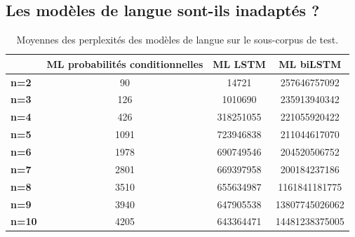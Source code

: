 \documentclass[10pt,twoside]{article}
\begin{document}
    \subsection{Les modèles de langue sont-ils inadaptés ?}

    \begin{table}[h]
    \begin{footnotesize}
    \begin{center}
    \begin{tabular}{|l|c|c|c|}
    \hline
                  & \textbf{ML probabilités conditionnelles} & \multicolumn{1}{r|}{\textbf{ML LSTM}} & \textbf{ML biLSTM} \\ \hline
    \textbf{n=2}  & 90                                       & 14721                                 & 257646757092       \\ \hline
    \textbf{n=3}  & 126                                      & 1010690                               & 235913940342       \\ \hline
    \textbf{n=4}  & 426                                      & 318251055                             & 221055920422       \\ \hline
    \textbf{n=5}  & 1091                                     & 723946838                             & 211044617070       \\ \hline
    \textbf{n=6}  & 1978                                     & 690749546                             & 204520506752       \\ \hline
    \textbf{n=7}  & 2801                                     & 669397958                             & 200184237186       \\ \hline
    \textbf{n=8}  & 3510                                     & 655634987                             & 1161841181775      \\ \hline
    \textbf{n=9}  & 3940                                     & 647905538                             & 13807745026062     \\ \hline
    \textbf{n=10} & 4205                                     & 643364471                             & 14481238375005     \\ \hline
    \end{tabular}\caption{Moyennes des perplexités des modèles de langue sur le sous-corpus de test.}\label{tab:perplex}
    \end{center}
    \end{footnotesize}
    \end{table}
\end{document}
